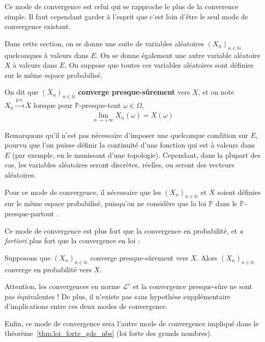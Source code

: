 \documentclass[../integ-proba.tex]{subfiles}
\begin{document}
    Ce mode de convergence est celui qui se rapproche le plus de la converence simple.
    Il faut cependant garder à l'esprit que c'est loin d'être le seul mode de convergence existant.

    Dans cette section, on se donne une suite de variables aléatoires $\left(X_n\right)_{n\in\mathbb{N}}$ quelconques à valeurs dans $E$.
    On se donne également une autre variable aléatoire $X$ à valeurs dans $E$.
    On suppose que toutes ces variables aléatoires sont définies sur le même espace probabilisé.

    \begin{defi}
        On dit que $\left(X_n\right)_{n\in\mathbb{N}}$ \textbf{converge presque-sûrement} vers $X$, et on note $X_n \xrightarrow[]{\text{p.s.}} X$ lorsque pour $\mathbb{P}$-presque-tout $\omega \in \Omega$,
        \begin{displaymath}
            \lim_{n \to +\infty} X_n(\omega) = X(\omega)
        \end{displaymath}
    \end{defi}

    \begin{rem}
        Remarquons qu'il n'est pas nécessaire d'imposer une quelconque condition sur $E$, pourvu que l'on puisse définir la continuité d'une fonction qui est à valeurs dans $E$ (par exemple, en le munissant d'une topologie).
        Cependant, dans la plupart des cas, les variables aléatoires seront discrètes, réelles, ou seront des vecteurs aléatoires.
    \end{rem}

    \begin{rem}
        Pour ce mode de convergence, il nécessaire que les $\left(X_n\right)_{n\in\mathbb{N}}$ et $X$ soient définies sur le même espace probabilisé, puisqu'on ne considère que la loi $\mathbb{P}$ dans le \og $\mathbb{P}$-presque-partout \fg.
    \end{rem}

    Ce mode de convergence est plus fort que la convergence en probabilité, et \textit{a fortiori} plus fort que la convergence en loi :

    \begin{prop}
        Supposons que $\left(X_n\right)_{n\in\mathbb{N}}$ converge presque-sûrement vers $X$.
        Alors $\left(X_n\right)_{n\in\mathbb{N}}$ converge en probabilité vers $X$.
    \end{prop}

    \begin{rem}
        Attention, les convergences en norme $\mathcal{L}^r$ et la convergence presque-sûre ne sont pas équivalentes !
        De plus, il n'existe pas sans hypothèse supplémentaire d'implications entre ces deux modes de convergence.
    \end{rem}


    \begin{rem}
        Enfin, ce mode de convergence sera l'autre mode de convergence impliqué dans le théorème~\ref{thm:loi_forte_gds_nbs} (loi forte des grands nombres).
    \end{rem}
\end{document}
